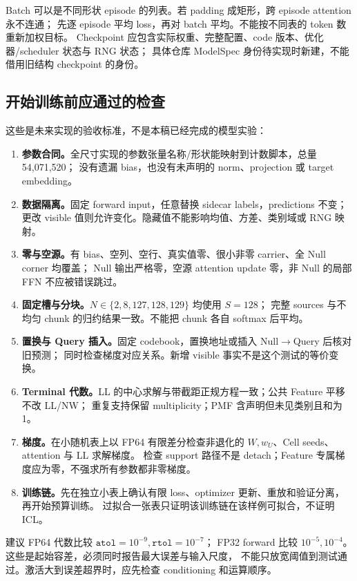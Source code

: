 \documentclass[11pt,UTF8,fontset=fandol]{ctexart}
\begin{document}
Batch 可以是不同形状 episode 的列表。若 padding 成矩形，跨 episode attention 永不连通；
先逐 episode 平均 loss，再对 batch 平均。不能按不同表的 token 数重新加权目标。
Checkpoint 应包含实际权重、完整配置、code 版本、优化器/scheduler 状态与 RNG 状态；
具体仓库 ModelSpec 身份待实现时新建，不能借用旧结构 checkpoint 的身份。

\subsection{开始训练前应通过的检查}
这些是未来实现的验收标准，不是本稿已经完成的模型实验：
\begin{enumerate}
\item \textbf{参数合同。}全尺寸实现的参数张量名称/形状能映射到计数脚本，总量 54,071,520；
没有遗漏 bias，也没有未声明的 norm、projection 或 target embedding。
\item \textbf{数据隔离。}固定 forward input，任意替换 sidecar labels，predictions 不变；
更改 visible 值则允许变化。隐藏值不能影响均值、方差、类别域或 RNG 映射。
\item \textbf{零与空源。}有 bias、空列、空行、真实值零、很小非零 carrier、全 Null corner 均覆盖；
Null 输出严格零，空源 attention update 零，非 Null 的局部 FFN 不应被错误跳过。
\item \textbf{固定槽与分块。}$N\in\{2,8,127,128,129\}$ 均使用 $S=128$；
完整 sources 与不均匀 chunk 的归约结果一致。不能把 chunk 各自 softmax 后平均。
\item \textbf{置换与 Query 插入。}固定 codebook，置换地址或插入 Null$\to$Query 后核对旧预测；
同时检查梯度对应关系。新增 visible 事实不是这个测试的等价变换。
\item \textbf{Terminal 代数。}LL 的中心求解与带截距正规方程一致；公共 Feature 平移不改 LL/NW；
重复支持保留 multiplicity；PMF 含声明但未见类别且和为 1。
\item \textbf{梯度。}在小随机表上以 FP64 有限差分检查非退化的 $W,w_U$、Cell seeds、attention 与 LL 求解梯度。
检查 support 路径不是 detach；Feature 专属梯度应为零，不强求所有参数都非零梯度。
\item \textbf{训练链。}先在独立小表上确认有限 loss、optimizer 更新、重放和验证分离，再开始预算训练。
过拟合一张表只证明该训练链在该样例可拟合，不证明 ICL。
\end{enumerate}

建议 FP64 代数比较 $\texttt{atol}=10^{-9},\texttt{rtol}=10^{-7}$；
FP32 forward 比较 $10^{-5},10^{-4}$。这些是起始容差，必须同时报告最大误差与输入尺度，
不能只放宽阈值到测试通过。激活大到误差超界时，应先检查 conditioning 和运算顺序。
\end{document}
